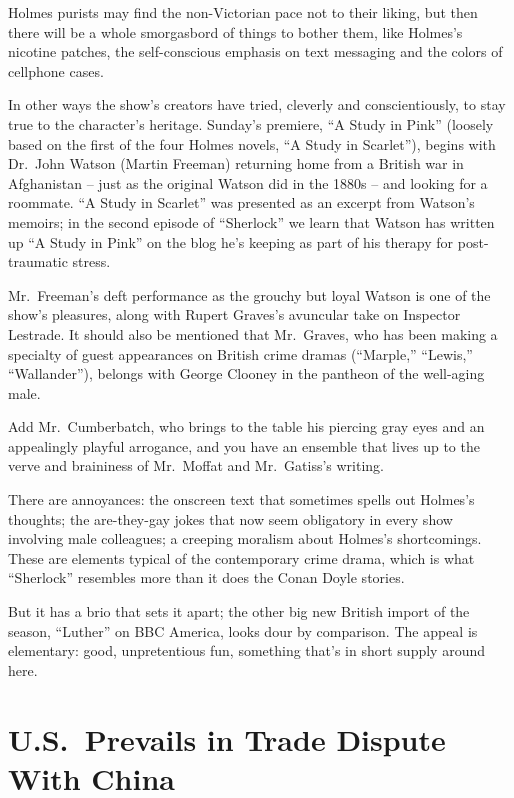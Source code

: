 ﻿\documentclass[12pt]{article}
\begin{document}
Holmes purists may find the non-Victorian pace not to their liking, but then there will be a whole
smorgasbord of things to bother them, like Holmes's nicotine patches, the self-conscious emphasis on
text messaging and the colors of cellphone cases.

In other ways the show's creators have tried, cleverly and conscientiously, to stay true to the
character's heritage. Sunday's premiere, ``A Study in Pink'' (loosely based on the first of the four
Holmes novels, ``A Study in Scarlet''), begins with Dr.~John Watson (Martin Freeman) returning home
from a British war in Afghanistan -- just as the original Watson did in the 1880s -- and looking for
a roommate. ``A Study in Scarlet'' was presented as an excerpt from Watson's memoirs; in the second
episode of ``Sherlock'' we learn that Watson has written up ``A Study in Pink'' on the blog he's
keeping as part of his therapy for post-traumatic stress.

Mr.~Freeman's deft performance as the grouchy but loyal Watson is one of the show's pleasures, along
with Rupert Graves's avuncular take on Inspector Lestrade. It should also be mentioned that
Mr.~Graves, who has been making a specialty of guest appearances on British crime dramas
(``Marple,'' ``Lewis,'' ``Wallander''), belongs with George Clooney in the pantheon of the
well-aging male.

Add Mr.~Cumberbatch, who brings to the table his piercing gray eyes and an appealingly playful
arrogance, and you have an ensemble that lives up to the verve and braininess of Mr.~Moffat and
Mr.~Gatiss's writing.

There are annoyances: the onscreen text that sometimes spells out Holmes's thoughts; the
are-they-gay jokes that now seem obligatory in every show involving male colleagues; a creeping
moralism about Holmes's shortcomings. These are elements typical of the contemporary crime drama,
which is what ``Sherlock'' resembles more than it does the Conan Doyle stories.

But it has a brio that sets it apart; the other big new British import of the season, ``Luther'' on
BBC America, looks dour by comparison. The appeal is elementary: good, unpretentious fun, something
that's in short supply around here.

\section{U.S.~Prevails in Trade Dispute With China }
\end{document}
